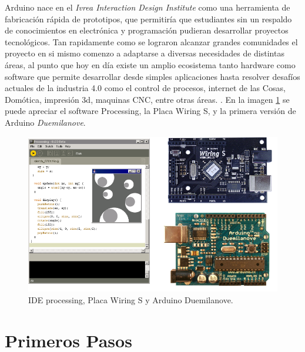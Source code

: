 \documentclass[letterpaper, 10pt]{report}
\begin{document}

Arduino nace en el \emph{Ivrea Interaction Design Institute} como una herramienta de fabricación rápida de prototipos, que permitiría que estudiantes sin un respaldo de conocimientos en electrónica y programación pudieran desarrollar proyectos tecnológicos. Tan rapidamente como se lograron alcanzar grandes comunidades el proyecto en si mismo comenzo a adaptarse a diversas necesidades de distintas áreas, al punto que hoy en día existe un amplio ecosistema tanto hardware como software que permite desarrollar desde simples aplicaciones hasta resolver desafíos actuales de la industria 4.0 como el control de procesos, internet de las Cosas, Domótica, impresión 3d, maquinas CNC, entre otras áreas. \cite{queEsArduino}. En la imagen \ref{awp} se puede apreciar el software Processing, la Placa Wiring S, y la primera versión de Arduino \emph{Duemilanove}.

\begin{figure}[h]
	\centering
	\includegraphics[scale=0.6]{awp.png}
	\caption{IDE processing, Placa Wiring S y Arduino Duemilanove. \label{awp}}
\end{figure}
	
\section{Primeros Pasos}
\end{document}
